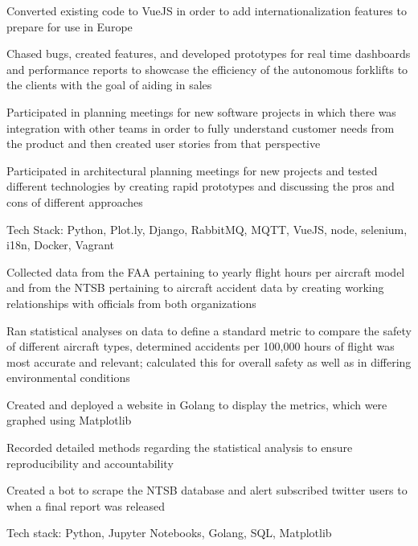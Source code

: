 \documentclass[letterpaper]{resume}
\begin{document}
\begin{compactitem}
\item Converted existing code to VueJS in order to add internationalization features to prepare for use in Europe
\item Chased bugs, created features, and developed prototypes for real time dashboards and performance reports to showcase the efficiency of the autonomous forklifts to the clients with the goal of aiding in sales
\item Participated in planning meetings for new software projects in which there was integration with other teams in order to fully understand customer needs from the product and then created user stories from that perspective
\item Participated in architectural planning meetings for new projects and tested different technologies by creating rapid prototypes and discussing the pros and cons of different approaches
\item Tech Stack: Python, Plot.ly, Django, RabbitMQ, MQTT, VueJS, node, selenium, i18n, Docker, Vagrant
\end{compactitem}

\begin{compactitem}
\item Collected data from the FAA pertaining to yearly flight hours per aircraft model and from the NTSB pertaining to aircraft accident data by creating working relationships with officials from both organizations
\item Ran statistical analyses on data to define a standard metric to compare the safety of different aircraft types, determined accidents per 100,000 hours of flight was most accurate and relevant; calculated this for overall safety as well as in differing environmental conditions
\item Created and deployed a website in Golang to display the metrics, which were graphed using Matplotlib
\item Recorded detailed methods regarding the statistical analysis to ensure reproducibility and accountability
\item Created a bot to scrape the NTSB database and alert subscribed twitter users to when a final report was released
\item Tech stack: Python, Jupyter Notebooks, Golang, SQL, Matplotlib
\end{compactitem}
\end{document}

